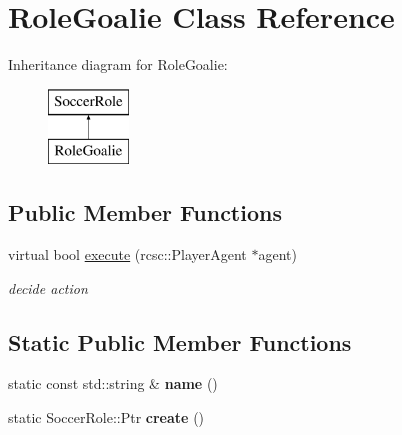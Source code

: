 \hypertarget{classRoleGoalie}{
\section{RoleGoalie Class Reference}
\label{classRoleGoalie}
}
Inheritance diagram for RoleGoalie:\begin{figure}[H]
\begin{center}
\leavevmode
\includegraphics[height=2.000000cm]{classRoleGoalie}
\end{center}
\end{figure}
\subsection*{Public Member Functions}
\begin{DoxyCompactItemize}
\item 
\hypertarget{classRoleGoalie_a53bf55ca7972bc8b3e37f6029634b60a}{
virtual bool \hyperlink{classRoleGoalie_a53bf55ca7972bc8b3e37f6029634b60a}{execute} (rcsc::PlayerAgent $\ast$agent)}
\label{classRoleGoalie_a53bf55ca7972bc8b3e37f6029634b60a}

\begin{DoxyCompactList}\small\item\em decide action \item\end{DoxyCompactList}\end{DoxyCompactItemize}
\subsection*{Static Public Member Functions}
\begin{DoxyCompactItemize}
\item 
\hypertarget{classRoleGoalie_a95aad8b331bc8fe3fef43b7619a564db}{
static const std::string \& {\bfseries name} ()}
\label{classRoleGoalie_a95aad8b331bc8fe3fef43b7619a564db}

\item 
\hypertarget{classRoleGoalie_a7a494f1f152bb7734c4e0b5080586ee0}{
static SoccerRole::Ptr {\bfseries create} ()}
\label{classRoleGoalie_a7a494f1f152bb7734c4e0b5080586ee0}

\end{DoxyCompactItemize}
